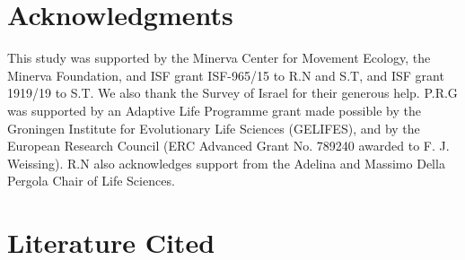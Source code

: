 \begin{refsection}
\section*{Acknowledgments}

This study was supported by the Minerva Center for Movement Ecology, the Minerva Foundation, and ISF grant ISF-965/15 to R.N and S.T, and ISF grant 1919/19 to S.T. We also thank the Survey of Israel for their generous help. 
P.R.G was supported by an Adaptive Life Programme grant made possible by the Groningen Institute for Evolutionary Life Sciences (GELIFES), and by the European Research Council (ERC Advanced Grant No. 789240 awarded to F. J. Weissing).
R.N also acknowledges support from the Adelina and Massimo Della Pergola Chair of Life Sciences.

\newrefcontext[sorting=nyt]
\section*{Literature Cited}
\printbibliography[title={Literature~Cited},heading=none]
\end{refsection}